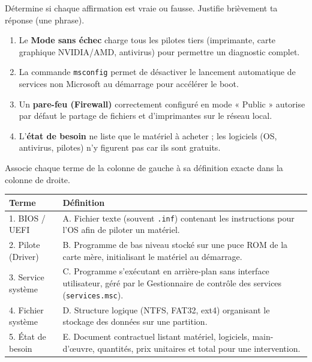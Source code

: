 \documentclass[11pt]{article}
\begin{document}
\begin{exercice}
Détermine si chaque affirmation est vraie ou fausse. Justifie brièvement ta réponse (une phrase).
\begin{enumerate}
    \item Le \textbf{Mode sans échec} charge tous les pilotes tiers (imprimante, carte graphique NVIDIA/AMD, antivirus) pour permettre un diagnostic complet.
    \item La commande \texttt{msconfig} permet de désactiver le lancement automatique de services non Microsoft au démarrage pour accélérer le boot.
    \item Un \textbf{pare-feu (Firewall)} correctement configuré en mode « Public » autorise par défaut le partage de fichiers et d'imprimantes sur le réseau local.
    \item L'\textbf{état de besoin} ne liste que le matériel à acheter ; les logiciels (OS, antivirus, pilotes) n'y figurent pas car ils sont gratuits.
\end{enumerate}
\end{exercice}

\begin{exercice}
Associe chaque terme de la colonne de gauche à sa définition exacte dans la colonne de droite.
\begin{center}
\begin{tabularx}{\linewidth}{|l|X|}\hline
\textbf{Terme} & \textbf{Définition} \\\hline
1. BIOS / UEFI & A. Fichier texte (souvent \texttt{.inf}) contenant les instructions pour l'OS afin de piloter un matériel. \\\hline
2. Pilote (Driver) & B. Programme de bas niveau stocké sur une puce ROM de la carte mère, initialisant le matériel au démarrage. \\\hline
3. Service système & C. Programme s'exécutant en arrière-plan sans interface utilisateur, géré par le Gestionnaire de contrôle des services (\texttt{services.msc}). \\\hline
4. Fichier système & D. Structure logique (NTFS, FAT32, ext4) organisant le stockage des données sur une partition. \\\hline
5. État de besoin & E. Document contractuel listant matériel, logiciels, main-d'œuvre, quantités, prix unitaires et total pour une intervention. \\\hline
\end{tabularx}
\end{center}
\end{exercice}
\end{document}
